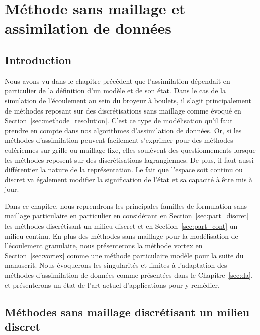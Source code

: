 
\chapter{Méthode sans maillage et assimilation de données}

\section{Introduction}

Nous avons vu dans le chapitre précédent que l'assimilation dépendait en particulier de la définition d'un modèle et de son état. Dans le cas de la simulation de l'écoulement au sein du broyeur à boulets, il s'agit principalement de méthodes reposant sur des discrétisations sans maillage comme évoqué en Section~\ref{sec:methode_resolution}. C'est ce type de modélisation qu'il faut prendre en compte dans nos algorithmes d'assimilation de données. Or, si les méthodes d'assimilation peuvent facilement s'exprimer pour des méthodes eulériennes sur grille ou maillage fixe, elles soulèvent des questionnements lorsque les méthodes reposent sur des discrétisations lagrangiennes. De plus, il faut aussi différentier la nature de la représentation. Le fait que l'espace soit continu ou discret va également modifier la signification de l'état et sa capacité à être mis à jour.

Dans ce chapitre, nous reprendrons les principales familles de formulation sans maillage particulaire en particulier en considérant en Section~\ref{sec:part_discret} les méthodes discrétisant un milieu discret et en Section~\ref{sec:part_cont} un milieu continu. En plus des méthodes sans maillage pour la modélisation de l'écoulement granulaire, nous présenterons la méthode vortex en Section~\ref{sec:vortex} comme une méthode particulaire modèle pour la suite du manuscrit. Nous évoquerons les singularités et limites à l'adaptation des méthodes d'assimilation de données comme présentées dans le Chapitre~\ref{sec:da}, et présenterons un état de l'art actuel d'applications pour y remédier.

\section{Méthodes sans maillage discrétisant un milieu discret}~\label{sec:part_discret}

